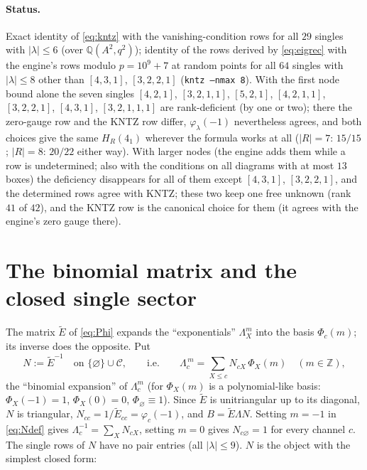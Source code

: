 \documentclass[11pt]{article}
\newcommand{\Lam}{\Lambda}
\newcommand{\Et}{\widetilde{E}}
\newcommand{\vac}{\varnothing}
\newcommand{\Chan}{\mathcal C}
\newcommand{\LMPH}[1]{\texttt{#1}}
\begin{document}
\paragraph{Status.}  Exact identity of \eqref{eq:kntz} with the vanishing-condition rows for all $29$ singles with
$|\lambda|\le 6$ (over $\mathbb Q(A^2,q^2)$); identity of the rows derived by \eqref{eq:eigrec} with the engine's rows
modulo $p=10^9+7$ at random points for all $64$ singles with $|\lambda|\le8$ other than $[4,3,1]$, $[3,2,2,1]$
(\LMPH{kntz --nmax 8}).  With the first node bound alone the seven singles $[4,2,1]$, $[3,2,1,1]$, $[5,2,1]$, $[4,2,1,1]$,
$[3,2,2,1]$, $[4,3,1]$, $[3,2,1,1,1]$ are rank-deficient (by one or two); there the zero-gauge row and the KNTZ row
differ, $\varphi_\lambda(-1)$ nevertheless agrees, and both choices give the same $H_R(4_1)$ wherever the formula
works at all ($|R|=7$: $15/15$; $|R|=8$: $20/22$ either way).  With larger nodes (the engine adds them while a row is
undetermined; also with the conditions on all diagrams with at most $13$ boxes) the deficiency disappears for all of
them except $[4,3,1]$, $[3,2,2,1]$, and the determined rows agree with KNTZ; these two keep one free unknown (rank $41$
of $42$), and the KNTZ row is the canonical choice for them (it agrees with the engine's zero gauge there).

\section{The binomial matrix and the closed single sector}\label{sec:N}

The matrix $\Et$ of \eqref{eq:Phi} expands the ``exponentials'' $\Lam_X^m$ into the basis $\Phi_c(m)$; its inverse does
the opposite.  Put
\begin{equation}\label{eq:Ndef}
N:=\Et^{-1}\quad\text{on }\{\vac\}\cup\Chan,\qquad\text{i.e.}\qquad \Lam_c^{\,m}=\sum_{X\le c}N_{cX}\,\Phi_X(m)\quad(m\in\mathbb Z),
\end{equation}
the ``binomial expansion'' of $\Lam_c^m$ (for $\Phi_X(m)$ is a polynomial-like basis: $\Phi_X(-1)=1$, $\Phi_X(0)=0$,
$\Phi_\vac\equiv1$).  Since $\Et$ is unitriangular up to its diagonal, $N$ is triangular, $N_{cc}=1/\Et_{cc}=\varphi_c(-1)$,
and $B=\Et\Lam N$.  Setting $m=-1$ in \eqref{eq:Ndef} gives $\Lam_c^{-1}=\sum_X N_{cX}$, setting $m=0$ gives
$N_{c\vac}=1$ for every channel $c$.  The single rows of $N$ have no pair entries (all $|\lambda|\le 9$).  $N$ is the
object with the simplest closed form:
\end{document}
